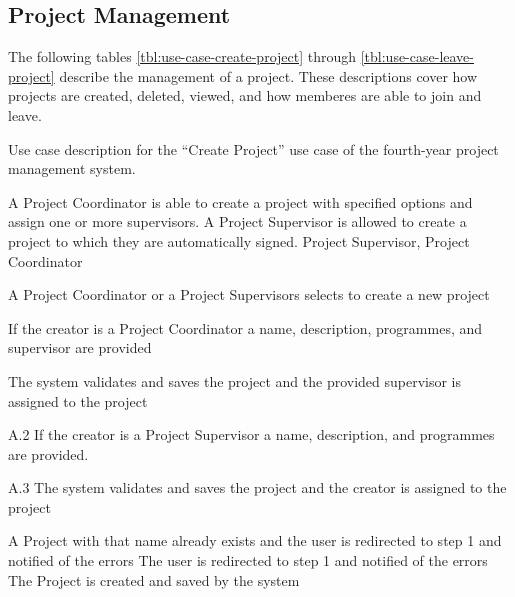 \documentclass[document.tex]{subfiles}
\begin{document}
\FloatBarrier

\subsection{Project Management}
\label{sec:project-management}

The following tables \ref{tbl:use-case-create-project} through \ref{tbl:use-case-leave-project} describe the management of a project. These descriptions cover how projects are created, deleted, viewed, and how memberes are able to join and leave.


\begin{table}
  \centering
  \caption{Use case description for the ``Create Project'' use case of the fourth-year project management system.}
  \label{tbl:use-case-create-project}

  \begin{usecase}
    A Project Coordinator is able to create a project with specified options and assign one or more supervisors. A Project Supervisor is allowed to create a project to which they are automatically signed.
    Project Supervisor, Project Coordinator
    \ucnormal
    \begin{ucenum}
      \item A Project Coordinator or a Project Supervisors selects to create a new project
      \item If the creator is a Project Coordinator a name, description, programmes, and supervisor are provided
      \item The system validates and saves the project and the provided supervisor is assigned to the project
    \end{ucenum}
    \begin{ucenum}
      \item [A.2] If the creator is a Project Supervisor a name, description, and programmes are provided.
      \item [A.3] The system validates and saves the project and the creator is assigned to the project
    \end{ucenum}
    A Project with that name already exists and the user is redirected to step 1 and notified of the errors
    The user is redirected to step 1 and notified of the errors
    The Project is created and saved by the system
  \end{usecase}
\end{table}
\end{document}
